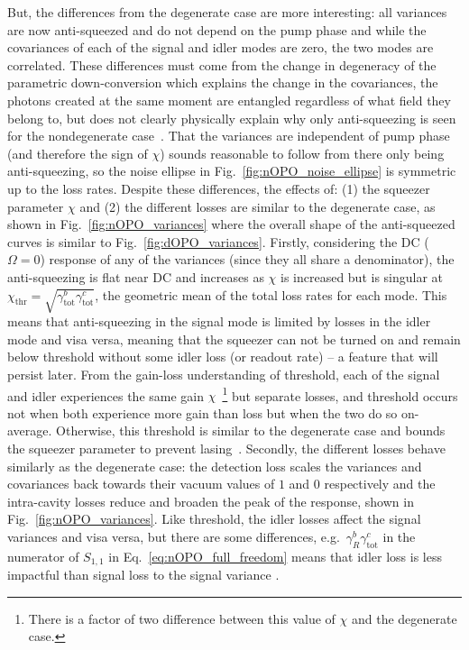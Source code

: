 But, the differences from the degenerate case are more interesting: all variances are now anti-squeezed and do not depend on the pump phase and while the covariances of each of the signal and idler modes are zero, the two modes are correlated. These differences must come from the change in degeneracy of the parametric down-conversion which explains the change in the covariances, the photons created at the same moment are entangled regardless of what field they belong to, but does not clearly physically explain why only anti-squeezing is seen for the nondegenerate case~\cite{}. That the variances are independent of pump phase (and therefore the sign of $\chi$) sounds reasonable  to follow from there only being anti-squeezing, so the noise ellipse in Fig.~\ref{fig:nOPO_noise_ellipse} is symmetric up to the loss rates. Despite these differences, the effects of: (1) the squeezer parameter $\chi$ and (2) the different losses are similar to the degenerate case, as shown in Fig.~\ref{fig:nOPO_variances} where the overall shape of the anti-squeezed curves is similar to Fig.~\ref{fig:dOPO_variances}. 
Firstly, considering the DC ($\Omega=0$) response of any of the variances (since they all share a denominator), the anti-squeezing is flat near DC and increases as $\chi$ is increased but is singular at $\chi_\text{thr}=\sqrt{\gamma^b_\text{tot}\gamma^c_\text{tot}}$, the geometric mean of the total loss rates for each mode. This means that anti-squeezing in the signal mode is limited by losses in the idler mode and visa versa, meaning that the squeezer can not be turned on and remain below threshold without some idler loss (or readout rate) -- a feature that will persist later. From the gain-loss understanding of threshold, each of the signal and idler experiences the same gain $\chi$~\footnote{There is a factor of two difference between this value of $\chi$ and the degenerate case.} but separate losses, and threshold occurs not when both experience more gain than loss but when the two do so on-average.  Otherwise, this threshold is similar to the degenerate case and bounds the squeezer parameter to prevent lasing~\cite{}. 
Secondly, the different losses behave similarly as the degenerate case: the detection loss scales the variances and covariances back towards their vacuum values of $1$ and $0$ respectively and the intra-cavity losses reduce and broaden the peak of the response, shown in Fig.~\ref{fig:nOPO_variances}. Like threshold, the idler losses affect the signal variances and visa versa, but there are some differences, e.g.\ $\gamma^b_R {\gamma^c_\text{tot}}$ in the numerator of $S_{1,1}$ in Eq.~\ref{eq:nOPO_full_freedom} means that idler loss is less impactful than signal loss to the signal variance . 



